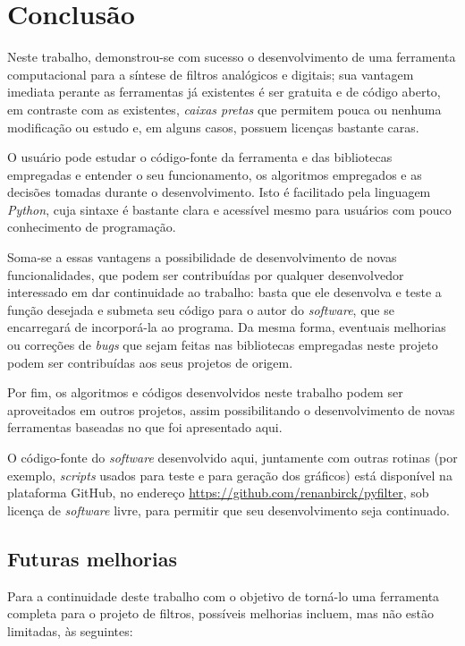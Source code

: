 \chapter{Conclusão}

Neste trabalho, demonstrou-se com sucesso o desenvolvimento de uma ferramenta computacional para a síntese de filtros analógicos e digitais; sua vantagem imediata perante as ferramentas já existentes é ser gratuita e de código aberto, em contraste com as existentes, \textit{caixas pretas} que permitem pouca ou nenhuma modificação ou estudo e, em alguns casos, possuem licenças bastante caras.

O usuário pode estudar o código-fonte da ferramenta e das bibliotecas empregadas e entender o seu funcionamento, os algoritmos empregados e as decisões tomadas durante o desenvolvimento. Isto é facilitado pela linguagem \textit{Python}, cuja sintaxe é bastante clara e acessível mesmo para usuários com pouco conhecimento de programação.

Soma-se a essas vantagens a possibilidade de desenvolvimento de novas funcionalidades, que podem ser contribuídas por qualquer desenvolvedor interessado em dar continuidade ao trabalho: basta que ele desenvolva e teste a função desejada e submeta seu código para o autor do \textit{software}, que se encarregará de incorporá-la ao programa. Da mesma forma, eventuais melhorias ou correções de \textit{bugs} que sejam feitas nas bibliotecas empregadas neste projeto podem ser contribuídas aos seus projetos de origem.

Por fim, os algoritmos e códigos desenvolvidos neste trabalho podem ser aproveitados em outros projetos, assim possibilitando o desenvolvimento de novas ferramentas baseadas no que foi apresentado aqui. 

O código-fonte do \textit{software} desenvolvido aqui, juntamente com outras rotinas (por exemplo, \textit{scripts} usados para teste e para geração dos gráficos) está disponível na plataforma GitHub, no endereço \url{https://github.com/renanbirck/pyfilter}, sob licença de \textit{software} livre, para permitir que seu desenvolvimento seja continuado.

\newpage
\section{Futuras melhorias}
\label{sec:improvements}
Para a continuidade deste trabalho com o objetivo de torná-lo uma ferramenta completa para o projeto de filtros, possíveis melhorias incluem, mas não estão limitadas, às seguintes:

